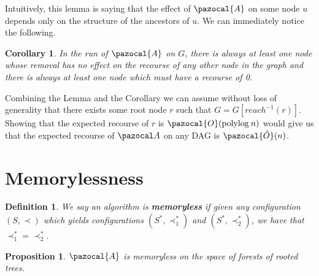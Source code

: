 \documentclass{article}
\newtheorem{corollary}{Corollary}
\newtheorem{proposition}{Proposition}
\newtheorem{definition}{Definition}
\begin{document}
Intuitively, this lemma is saying that the effect of $\pazocal{A}$ on some node $u$ depends only on the structure of the ancestors of $u$. We can immediately notice the following.

\begin{corollary}
In the run of $\pazocal{A}$ on $G$, there is always at least one node whose removal has no effect on the recourse of any other node in the graph and there is always at least one node which must have a recourse of 0.
\end{corollary}

Combining the Lemma and the Corollary we can assume without loss of generality that there exists some root node $r$ such that $G = G[reach^{-1}(r)]$. Showing that the expected recourse of $r$ is $\pazocal{O}(\textrm{polylog} \: n)$ would give us that the expected recourse of $\pazocal A$ on any DAG is $\pazocal{\tilde O}(n)$. 

\section{Memorylessness}

\begin{definition}
We say an algorithm is \textbf{memoryless} if given any configuration $(S, \prec)$ which yields configurations $(S^*, \prec^*_1)$ and $(S^*, \prec^*_2)$, we have that $\prec^*_1 = \prec^*_2$.
\end{definition}

\begin{proposition}
$\pazocal{A}$ is memoryless on the space of forests of rooted trees.
\end{proposition}
\end{document}

